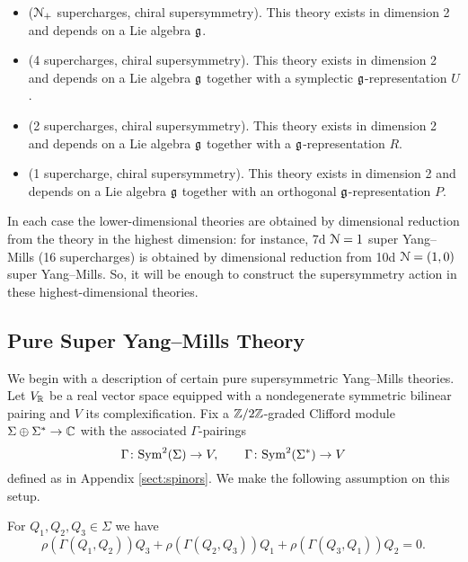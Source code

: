 \documentclass[10pt, oneside]{article}
\begin{document}
\begin{itemize}
\item ($\mathcal N_+$ supercharges, chiral supersymmetry). This theory exists in dimension 2 and depends on a Lie algebra $\mathfrak g$.

\item (4 supercharges, chiral supersymmetry). This theory exists in dimension 2 and depends on a Lie algebra $\mathfrak g$ together with a symplectic $\mathfrak g$-representation $U$.

\item (2 supercharges, chiral supersymmetry). This theory exists in dimension 2 and depends on a Lie algebra $\mathfrak g$ together with a $\mathfrak g$-representation $R$.

\item (1 supercharge, chiral supersymmetry). This theory exists in dimension 2 and depends on a Lie algebra $\mathfrak g$ together with an orthogonal $\mathfrak g$-representation $P$.
\end{itemize}

In each case the lower-dimensional theories are obtained by dimensional reduction from the theory in the highest dimension: for instance, 7d $\mathcal{N}=1$ super Yang--Mills (16 supercharges) is obtained by dimensional reduction from 10d $\mathcal{N}=(1, 0)$ super Yang--Mills. So, it will be enough to construct the supersymmetry action in these highest-dimensional theories.

\subsection{Pure Super Yang--Mills Theory}
\label{sect:gaugemultipletSUSY}

We begin with a description of certain pure supersymmetric Yang--Mills theories. Let $V_\mathbb R$ be a real vector space equipped with a nondegenerate symmetric bilinear pairing and $V$ its complexification. Fix a $\mathbb Z/2\mathbb Z$-graded Clifford module $\Sigma\oplus \Sigma^*\rightarrow \mathbb C$ with the associated $\Gamma$-pairings
\[\Gamma\colon {\rm Sym}^2(\Sigma)\rightarrow V,\qquad \Gamma\colon {\rm Sym}^2(\Sigma^*)\rightarrow V\]
defined as in Appendix \ref{sect:spinors}. We make the following assumption on this setup.

\begin{assumption}
For $Q_1, Q_2, Q_3\in\Sigma$ we have
\[\rho(\Gamma(Q_1, Q_2))Q_3 + \rho(\Gamma(Q_2, Q_3))Q_1 + \rho(\Gamma(Q_3, Q_1))Q_2 = 0.\]
\label{assumption:3psi}
\end{assumption}
\end{document}
